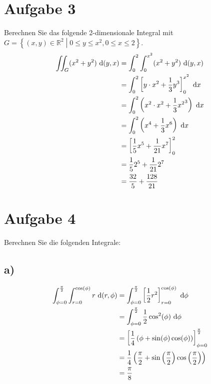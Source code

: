 \documentclass[main.tex]{subfiles}
\begin{document}
\section{Aufgabe 3}
Berechnen Sie das folgende 2-dimensionale Integral mit $G=\left\{ (x,y)\in \mathbb{R}^2 \middle| 0 \leq y \leq x^2, 0 \leq x \leq 2 \right\}$.
\begin{align*}
    \iint_G (x^2+y^2)~\mathrm{d}(y,x) &= \int_{0}^{2} \int_{0}^{x^2} (x^2+y^2)~\mathrm{d}(y,x) \\
                                &= \int_{0}^{2} \left[ y\cdot x^2 + \frac{1}{3} y^3 \right]_{0}^{x^2} ~\mathrm{d}x \\
                                &= \int_{0}^{2} \left( x^2\cdot x^2 + \frac{1}{3} {x^2}^3 \right) ~\mathrm{d}x \\
                                &= \int_{0}^{2} \left( x^4 + \frac{1}{3} x^6 \right) ~\mathrm{d}x \\
                                &= \left[ \frac{1}{5} x^5 + \frac{1}{21} x^7 \right]_{0}^{2} \\
                                &= \frac{1}{5} 2^5 + \frac{1}{21} 2^7 \\
                                &= \frac{32}{5} + \frac{128}{21} \\
\end{align*}

\pagebreak
\section{Aufgabe 4}
Berechnen Sie die folgenden Integrale:

\subsection{a)}
\begin{align*}
    \int_{\phi = 0}^{\frac{\pi}{2}} \int_{r=0}^{\cos (\phi)} r ~\mathrm{d}(r,\phi)
        &= \int_{\phi = 0}^{\frac{\pi}{2}} \left[ \frac{1}{2} r^2 \right]_{r=0}^{\cos (\phi)} ~\mathrm{d}\phi \\
        &= \int_{\phi = 0}^{\frac{\pi}{2}} \frac{1}{2} \cos^2(\phi) ~\mathrm{d}\phi \\
        &= \left[ \frac{1}{4} \left(\phi + \sin (\phi) \cos (\phi) \right) \right]_{\phi = 0}^{\frac{\pi}{2}} \\
        &= \frac{1}{4} \left(\frac{\pi}{2} + \sin \left(\frac{\pi}{2}\right) \cos \left(\frac{\pi}{2}\right) \right)  \\
        &= \frac{\pi}{8}
\end{align*}
\end{document}
